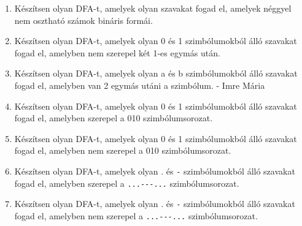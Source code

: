 \documentclass[a4paper]{article}
\begin{document}
\begin{enumerate}
\item Készítsen olyan DFA-t, amelyek olyan szavakat fogad el, amelyek néggyel
nem osztható számok bináris formái.

\item Készítsen olyan DFA-t, amelyek olyan 0 és 1 szimbólumokból álló szavakat
fogad el, amelyben nem szerepel két 1-es egymás után.

\item Készítsen olyan DFA-t, amelyek olyan a és b szimbólumokból álló szavakat
fogad el, amelyben van 2 egymás utáni a szimbólum.
- Imre Mária

\item Készítsen olyan DFA-t, amelyek olyan 0 és 1 szimbólumokból álló szavakat
fogad el, amelyben szerepel a 010 szimbólumsorozat.

\item Készítsen olyan DFA-t, amelyek olyan 0 és 1 szimbólumokból álló szavakat
fogad el, amelyben nem szerepel a 010 szimbólumsorozat.

\item Készítsen olyan DFA-t, amelyek olyan . és \verb|-| szimbólumokból álló szavakat
fogad el, amelyben szerepel a \verb|...---...| szimbólumsorozat.

\item Készítsen olyan DFA-t, amelyek olyan . és \verb|-| szimbólumokból álló szavakat
fogad el, amelyben nem szerepel a \verb|...---...| szimbólumsorozat.
\end{enumerate}


%
%
%
%
%
%
\end{document}
